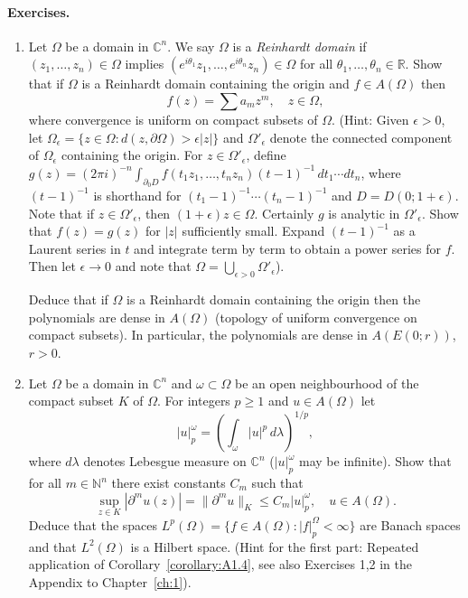 \paragraph*{Exercises.}
\begin{enumerate}
\item Let $\Omega$ be a domain in $\mathbb C^n$. We say $\Omega$ is a \emph{Reinhardt domain} if $(z_1,\ldots,z_n)\in\Omega$ implies $(e^{i\theta_1}z_1,\ldots,e^{i\theta_n}z_n)\in\Omega$ for all $\theta_1,\ldots,\theta_n\in\mathbb R$. Show that if $\Omega$ is a Reinhardt domain containing the origin and $f\in A(\Omega)$ then
\[f(z)=\sum a_mz^m,\quad z\in\Omega,\]
where convergence is uniform on compact subsets of $\Omega$. (Hint: Given $\epsilon>0$, let $\Omega_\epsilon=\{z\in\Omega:d(z,\partial\Omega)>\epsilon|z|\}$ and $\Omega'_\epsilon$ denote the connected component of $\Omega_\epsilon$ containing the origin. For $z\in\Omega'_\epsilon$, define $g(z)=(2\pi i)^{-n}\int_{\partial_0D}f(t_1z_1,\ldots,t_nz_n)(t-1)^{-1}\,dt_1\cdots dt_n$, where $(t-1)^{-1}$ is shorthand for $(t_1-1)^{-1}\cdots(t_n-1)^{-1}$ and $D=D(0;1+\epsilon)$. Note that if $z\in\Omega'_\epsilon$, then $(1+\epsilon)z\in\Omega$. Certainly $g$ is analytic in $\Omega'_\epsilon$. Show that $f(z)=g(z)$ for $|z|$ sufficiently small. Expand $(t-1)^{-1}$ as a Laurent series in $t$ and integrate term by term to obtain a power series for $f$. Then let $\epsilon\to0$ and note that $\Omega=\bigcup_{\epsilon>0}\Omega'_\epsilon$).

Deduce that if $\Omega$ is a Reinhardt domain containing the origin then the polynomials are dense in $A(\Omega)$ (topology of uniform convergence on compact subsets). In particular, the polynomials are dense in $A(E(0;r))$, $r>0$.
\item Let $\Omega$ be a domain in $\mathbb C^n$ and $\omega\subset\Omega$ be an open neighbourhood of the compact subset $K$ of $\Omega$. For integers $p\geq1$ and $u\in A(\Omega)$ let
\[|u|_p^\omega=\left(\int_\omega|u|^p\,d\lambda\right)^{1/p},\]
where $d\lambda$ denotes Lebesgue measure on $\mathbb C^n$ ($|u|_p^\omega$ may be infinite). Show that for all $m\in\mathbb N^n$ there exist constants $C_m$ such that
\[\sup_{z\in K}|\partial^m u(z)|=\|\partial^m u\|_K\leq C_m|u|_p^\omega,\quad u\in A(\Omega).\]
Deduce that the spaces $L^p(\Omega)=\{f\in A(\Omega):|f|_p^\Omega<\infty\}$ are Banach spaces and that $L^2(\Omega)$ is a Hilbert space. (Hint for the first part: Repeated application of Corollary~\ref{corollary:A1.4}, see also Exercises 1,2 in the Appendix to Chapter~\ref{ch:1}).
\end{enumerate}

